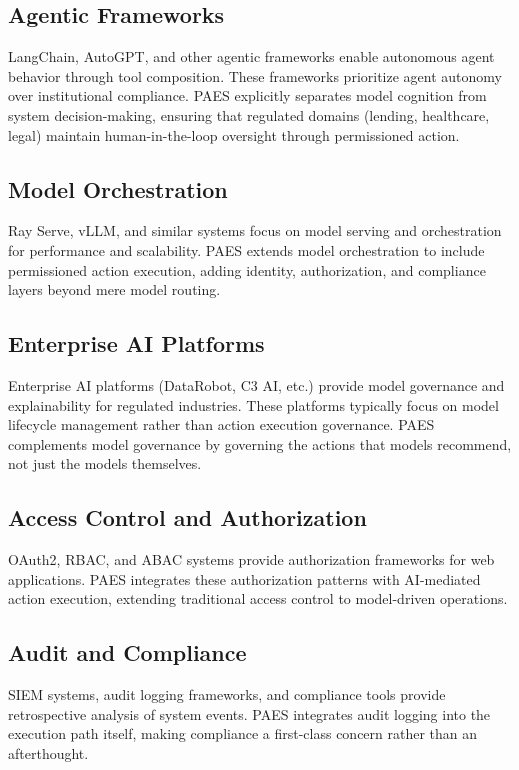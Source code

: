 \documentclass[11pt,a4paper]{article}
\begin{document}
\subsection{Agentic Frameworks}

LangChain, AutoGPT, and other agentic frameworks enable autonomous agent behavior through tool composition. These frameworks prioritize agent autonomy over institutional compliance. PAES explicitly separates model cognition from system decision-making, ensuring that regulated domains (lending, healthcare, legal) maintain human-in-the-loop oversight through permissioned action.

\subsection{Model Orchestration}

Ray Serve, vLLM, and similar systems focus on model serving and orchestration for performance and scalability. PAES extends model orchestration to include permissioned action execution, adding identity, authorization, and compliance layers beyond mere model routing.

\subsection{Enterprise AI Platforms}

Enterprise AI platforms (DataRobot, C3 AI, etc.) provide model governance and explainability for regulated industries. These platforms typically focus on model lifecycle management rather than action execution governance. PAES complements model governance by governing the actions that models recommend, not just the models themselves.

\subsection{Access Control and Authorization}

OAuth2, RBAC, and ABAC systems provide authorization frameworks for web applications. PAES integrates these authorization patterns with AI-mediated action execution, extending traditional access control to model-driven operations.

\subsection{Audit and Compliance}

SIEM systems, audit logging frameworks, and compliance tools provide retrospective analysis of system events. PAES integrates audit logging into the execution path itself, making compliance a first-class concern rather than an afterthought.
\end{document}
